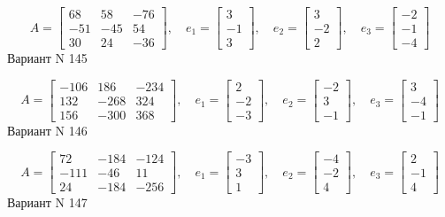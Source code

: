 \documentclass[11pt]{report}
\begin{document}
$$A = \left[\begin{matrix}68 & 58 & -76\\-51 & -45 & 54\\30 & 24 & -36\end{matrix}\right],\quad e_1 = \left[\begin{matrix}3\\-1\\3\end{matrix}\right],\quad e_2 = \left[\begin{matrix}3\\-2\\2\end{matrix}\right],\quad e_3 = \left[\begin{matrix}-2\\-1\\-4\end{matrix}\right]$$Вариант N 145

$$A = \left[\begin{matrix}-106 & 186 & -234\\132 & -268 & 324\\156 & -300 & 368\end{matrix}\right],\quad e_1 = \left[\begin{matrix}2\\-2\\-3\end{matrix}\right],\quad e_2 = \left[\begin{matrix}-2\\3\\-1\end{matrix}\right],\quad e_3 = \left[\begin{matrix}3\\-4\\-1\end{matrix}\right]$$Вариант N 146

$$A = \left[\begin{matrix}72 & -184 & -124\\-111 & -46 & 11\\24 & -184 & -256\end{matrix}\right],\quad e_1 = \left[\begin{matrix}-3\\3\\1\end{matrix}\right],\quad e_2 = \left[\begin{matrix}-4\\-2\\4\end{matrix}\right],\quad e_3 = \left[\begin{matrix}2\\-1\\4\end{matrix}\right]$$Вариант N 147
\end{document}
